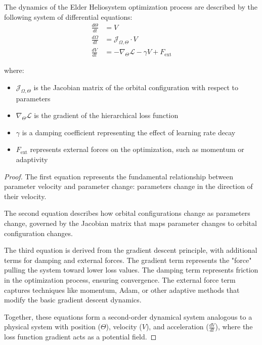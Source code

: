 \begin{theorem}
The dynamics of the Elder Heliosystem optimization process are described by the following system of differential equations:
\begin{align}
\frac{d\Theta}{dt} &= V \\
\frac{d\Omega}{dt} &= \mathcal{J}_{\Omega,\Theta} \cdot V \\
\frac{dV}{dt} &= -\nabla_{\Theta} \mathcal{L} - \gamma V + F_{\text{ext}}
\end{align}

where:
\begin{itemize}
    \item $\mathcal{J}_{\Omega,\Theta}$ is the Jacobian matrix of the orbital configuration with respect to parameters
    \item $\nabla_{\Theta} \mathcal{L}$ is the gradient of the hierarchical loss function
    \item $\gamma$ is a damping coefficient representing the effect of learning rate decay
    \item $F_{\text{ext}}$ represents external forces on the optimization, such as momentum or adaptivity
\end{itemize}
\end{theorem}

\begin{proof}
The first equation represents the fundamental relationship between parameter velocity and parameter change: parameters change in the direction of their velocity.

The second equation describes how orbital configurations change as parameters change, governed by the Jacobian matrix that maps parameter changes to orbital configuration changes.

The third equation is derived from the gradient descent principle, with additional terms for damping and external forces. The gradient term represents the "force" pulling the system toward lower loss values. The damping term represents friction in the optimization process, ensuring convergence. The external force term captures techniques like momentum, Adam, or other adaptive methods that modify the basic gradient descent dynamics.

Together, these equations form a second-order dynamical system analogous to a physical system with position ($\Theta$), velocity ($V$), and acceleration ($\frac{dV}{dt}$), where the loss function gradient acts as a potential field.
\end{proof}

